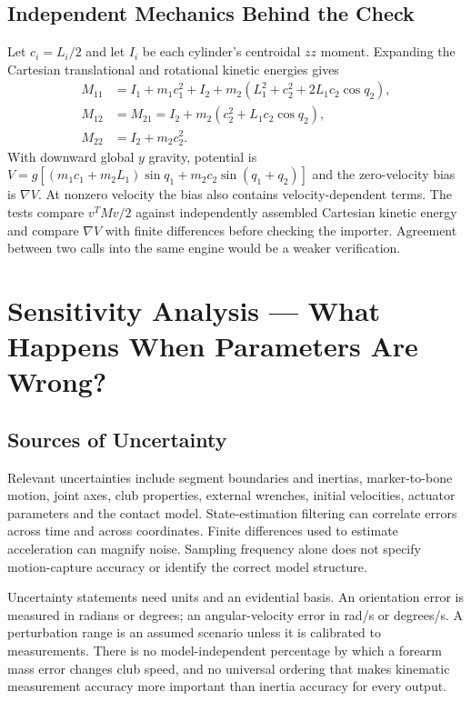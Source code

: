 \subsection{Independent Mechanics Behind the Check}

Let $c_i=L_i/2$ and let $I_i$ be each cylinder's centroidal $zz$ moment. Expanding the Cartesian translational and rotational kinetic energies gives
\begin{equation}
\begin{aligned}
M_{11}&=I_1+m_1c_1^2+I_2+m_2(L_1^2+c_2^2+2L_1c_2\cos q_2),\\
M_{12}&=M_{21}=I_2+m_2(c_2^2+L_1c_2\cos q_2),\\
M_{22}&=I_2+m_2c_2^2.
\end{aligned}
\end{equation}
With downward global $y$ gravity, potential is $V=g[(m_1c_1+m_2L_1)\sin q_1+m_2c_2\sin(q_1+q_2)]$ and the zero-velocity bias is $\nabla V$. At nonzero velocity the bias also contains velocity-dependent terms. The tests compare $v^TMv/2$ against independently assembled Cartesian kinetic energy and compare $\nabla V$ with finite differences before checking the importer. Agreement between two calls into the same engine would be a weaker verification.

\section{Sensitivity Analysis --- What Happens When Parameters Are Wrong?}
\label{sec:sensitivity}

\subsection{Sources of Uncertainty}

Relevant uncertainties include segment boundaries and inertias, marker-to-bone motion, joint axes, club properties, external wrenches, initial velocities, actuator parameters and the contact model. State-estimation filtering can correlate errors across time and across coordinates. Finite differences used to estimate acceleration can magnify noise. Sampling frequency alone does not specify motion-capture accuracy or identify the correct model structure.

Uncertainty statements need units and an evidential basis. An orientation error is measured in radians or degrees; an angular-velocity error in rad/s or degrees/s. A perturbation range is an assumed scenario unless it is calibrated to measurements. There is no model-independent percentage by which a forearm mass error changes club speed, and no universal ordering that makes kinematic measurement accuracy more important than inertia accuracy for every output.

